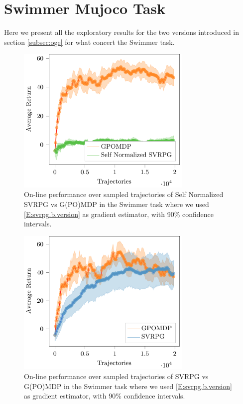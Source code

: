\clearpage
\section{Swimmer Mujoco Task}
\vspace{-0.05in}
Here we present all the exploratory results for the two versions introduced in section \ref{subsec:oge} for what concert the Swimmer task.
\begin{figure}[h]
	\begin{minipage}[h]{1\textwidth}
		\centering
		\includegraphics[width=0.75\textwidth]{Images/Experiments/swimmer_Self_SVRPG_vs_GPOMDP_B.pdf}
		\vspace{-0.1in}
		\caption{On-line performance over sampled trajectories of Self Normalized \acs{SVRPG} vs G(PO)MDP in the Swimmer task where we used \ref{E:svrpg.b.version} as gradient estimator, with 90\% confidence intervals.}
		\label{fig:swimmerthree}
	\end{minipage}
	\vspace{-0.15in}
\end{figure}
\begin{figure}[h]
	\begin{minipage}[h]{1\textwidth}
		\centering
		\includegraphics[width=0.75\textwidth]{Images/Experiments/swimmer_SVRPG_vs_GPOMDP_B.pdf}
		\vspace{-0.1in}
		\caption{On-line performance over sampled trajectories of \acs{SVRPG} vs G(PO)MDP in the Swimmer task where we used \ref{E:svrpg.b.version} as gradient estimator, with 90\% confidence intervals.}
		\label{fig:swimmerfive}
	\end{minipage}
	\vspace{-0.15in}
\end{figure}